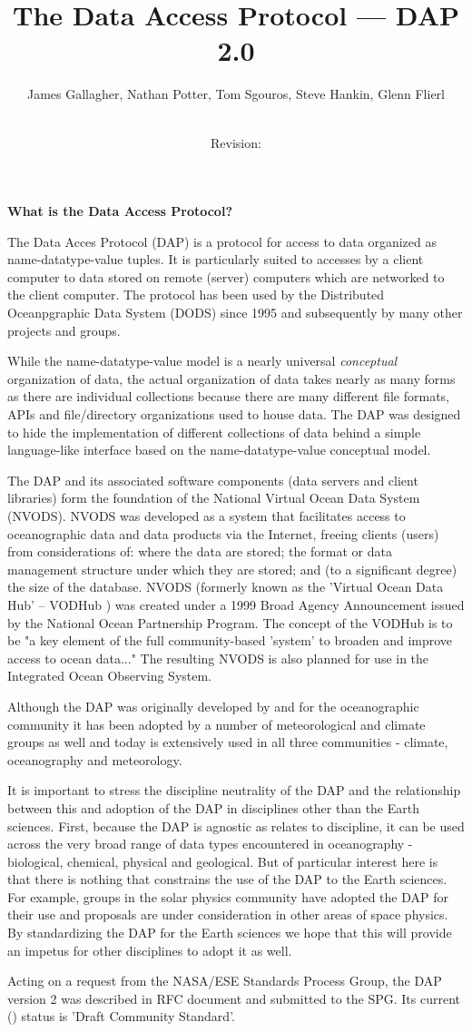 \documentclass[justify]{dods-paper}
\title{The Data Access Protocol --- DAP 2.0}
\author{James Gallagher, Nathan Potter, Tom Sgouros, Steve Hankin, Glenn
  Flierl}
\date{\rcsInfoDate \\ Revision: \rcsInfoRevision}
\begin{document}
\begin{center}
\textbf{What is the Data Access Protocol?}
\end{center}

The Data Acces Protocol (DAP) is a protocol for access to data organized as
name-datatype-value tuples. It is particularly suited to accesses by a client
computer to data stored on remote (server) computers which are networked to
the client computer. The protocol has been used by the Distributed
Oceanpgraphic Data System (DODS) since 1995 and subsequently by many other
projects and groups.

While the name-datatype-value model is a nearly universal \emph{conceptual}
organization of data, the actual organization of data takes nearly as many
forms as there are individual collections because there are many different
file formats, APIs and file/directory organizations used to house data. The
DAP was designed to hide the implementation of different collections of data
behind a simple language-like interface based on the name-datatype-value
conceptual model.

The DAP and its associated software components (data servers and client
libraries) form the foundation of the National Virtual Ocean Data System
(NVODS). NVODS was developed as a system that facilitates access to
oceanographic data and data products via the Internet, freeing clients
(users) from considerations of: where the data are stored; the format or data
management structure under which they are stored; and (to a significant
degree) the size of the database. NVODS (formerly known as the 'Virtual Ocean
Data Hub' -- VODHub ) was created under a 1999 Broad Agency Announcement
issued by the National Ocean Partnership Program. The concept of the
VODHub is to be "a key element of the full community-based 'system' to
broaden and improve access to ocean data..." The resulting NVODS is also
planned for use in the Integrated Ocean Observing System.

Although the DAP was originally developed by and for the oceanographic
community it has been adopted by a number of meteorological and climate
groups as well and today is extensively used in all three communities -
climate, oceanography and meteorology. 

It is important to stress the discipline neutrality of the DAP and the
relationship between this and adoption of the DAP in disciplines other than
the Earth sciences. First, because the DAP is agnostic as relates to
discipline, it can be used across the very broad range of data types
encountered in oceanography - biological, chemical, physical and geological.
But of particular interest here is that there is nothing that constrains the
use of the DAP to the Earth sciences. For example, groups in the solar
physics community have adopted the DAP for their use and proposals are under
consideration in other areas of space physics. By standardizing the DAP for
the Earth sciences we hope that this will provide an impetus for other
disciplines to adopt it as well.

Acting on a request from the NASA/ESE Standards Process Group, the DAP
version 2 was described in RFC document and submitted to the SPG. Its current
(\rcsInfoDate) status is 'Draft Community Standard'.
\end{document}
